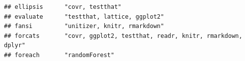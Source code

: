 \documentclass[]{article}
\begin{document}
\begin{verbatim}
## ellipsis      "covr, testthat"                                                                                                                                                                                                                                                                                                                                                                                                                                                                                                                                                                          
## evaluate      "testthat, lattice, ggplot2"                                                                                                                                                                                                                                                                                                                                                                                                                                                                                                                                                              
## fansi         "unitizer, knitr, rmarkdown"                                                                                                                                                                                                                                                                                                                                                                                                                                                                                                                                                              
## forcats       "covr, ggplot2, testthat, readr, knitr, rmarkdown, dplyr"                                                                                                                                                                                                                                                                                                                                                                                                                                                                                                                                 
## foreach       "randomForest"                                                                                                                                                                                                                                                                                                                                                                                                                                                                                                                                                                            

\end{verbatim}
\end{document}
